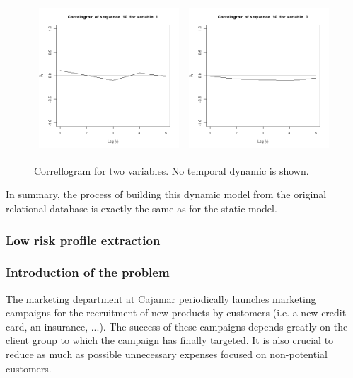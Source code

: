 \begin{figure}[h]
  \centering
    \begin{tabular}{cc}
    \includegraphics[width=70mm]{figures/CajaMarcrl1}&
     \includegraphics[width=70mm]{figures/CajaMarcrl3}\\
  \end{tabular}
    \caption{\label{fig:cajamarCorr}Correllogram for two variables. No temporal dynamic is shown.}
\end{figure}

In summary, the process of building this dynamic model from the original relational database 
is exactly the same as for the static model.

\subsubsection{Low risk profile extraction}
\subsubsection*{Introduction of the problem}

The marketing department at Cajamar periodically launches marketing campaigns for the recruitment of new products by customers (i.e. a new credit card, an insurance, ...). The success of these campaigns depends greatly on the client group to which the campaign has finally targeted. It is also crucial to reduce as much as possible unnecessary expenses focused on non-potential customers. 

